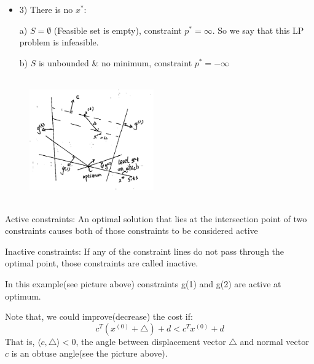 \begin{example}
\begin{itemize}
		\item 3) There is no $x^*$:
		
		\quad a) $S = \emptyset$ (Feasible set is empty), constraint $p^* = \infty$. So we say that this LP problem is infeasible.
		
		\quad b) $S$ is unbounded \& no minimum, constraint $p^* = -\infty$
	\end{itemize}
	
	
	\begin{figure}
		\centering
		\includegraphics[width=2.1in,height=2.1in]{figures/ch07/figure1012_8.png}
	\end{figure}
	
	Active constraints: An optimal solution that lies at the intersection point of two constraints causes both of those constraints to be considered active
	
	Inactive constraints: If any of the constraint lines do not pass through the optimal point, those constraints are called inactive.
	
	In this example(see picture above) constraints g(1) and g(2) are active at optimum.
	
	Note that, we could improve(decrease) the cost if:
	$$c^T(x^{(0)} + \bigtriangleup) + d < c^Tx^{(0)} + d$$
	That is, $\langle c, \bigtriangleup\rangle < 0$, the angle between displacement vector $\bigtriangleup$ and normal vector $c$ is an obtuse angle(see the picture above).
\end{example}





